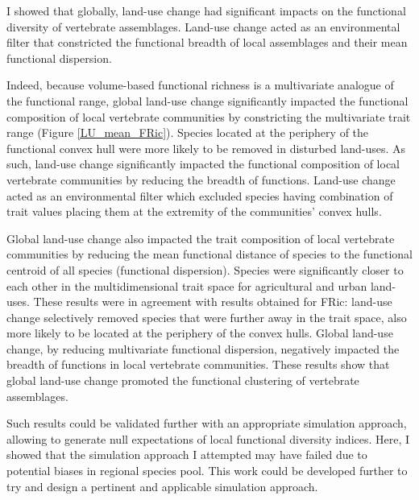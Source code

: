 I showed that globally, land-use change had significant impacts on the functional diversity of vertebrate assemblages. Land-use change acted as an environmental filter that constricted the functional breadth of local assemblages and their mean functional dispersion. 

Indeed, because volume-based functional richness is a multivariate analogue of the functional range, global land-use change significantly impacted the functional composition of local vertebrate communities by constricting the multivariate trait range (Figure \ref{LU_mean_FRic}). Species located at the periphery of the functional convex hull were more likely to be removed in disturbed land-uses. As such, land-use change significantly impacted the functional composition of local vertebrate communities by reducing the breadth of functions. Land-use change acted as an environmental filter which excluded species having combination of trait values placing them at the extremity of the communities' convex hulls. 

Global land-use change also impacted the trait composition of local vertebrate communities by reducing the mean functional distance of species to the functional centroid of all species (functional dispersion). Species were significantly closer to each other in the multidimensional trait space for agricultural and urban land-uses. These results were in agreement with results obtained for FRic: land-use change selectively removed species that were further away in the trait space, also more likely to be located at the periphery of the convex hulls. Global land-use change, by reducing multivariate functional dispersion, negatively impacted the breadth of functions in local vertebrate communities. These results show that global land-use change promoted the functional clustering of vertebrate assemblages.

Such results could be validated further with an appropriate simulation approach, allowing to generate null expectations of local functional diversity indices. Here, I showed that the simulation approach I attempted may have failed due to potential biases in regional species pool. This work could be developed further to try and design a pertinent and applicable simulation approach.


